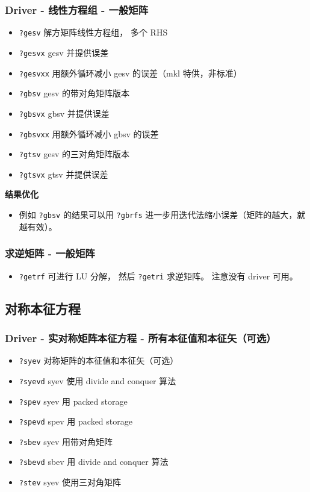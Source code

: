 \subsubsection{Driver - 线性方程组 - 一般矩阵}
\begin{itemize}
\item \verb`?gesv` 解方矩阵线性方程组， 多个 RHS
\item \verb`?gesvx` gesv 并提供误差
\item \verb`?gesvxx` 用额外循环减小 gesv 的误差（mkl 特供，非标准）
\item \verb`?gbsv` gesv 的带对角矩阵版本
\item \verb`?gbsvx` gbsv 并提供误差
\item \verb`?gbsvxx` 用额外循环减小 gbsv 的误差
\item \verb`?gtsv` gesv 的三对角矩阵版本
\item \verb`?gtsvx` gtsv 并提供误差
\end{itemize}

\textbf{结果优化}
\begin{itemize}
\item 例如 \verb`?gbsv` 的结果可以用 \verb`?gbrfs` 进一步用迭代法缩小误差（矩阵的越大，就越有效）。
\end{itemize}

\subsubsection{求逆矩阵 - 一般矩阵}
\begin{itemize}
\item \verb`?getrf` 可进行 LU 分解， 然后 \verb`?getri` 求逆矩阵。 注意没有 driver 可用。
\end{itemize}


\subsection{对称本征方程}
\subsubsection{Driver - 实对称矩阵本征方程 - 所有本征值和本征矢（可选）}
\begin{itemize}
\item \verb`?syev` 对称矩阵的本征值和本征矢（可选）
\item \verb`?syevd` syev 使用 divide and conquer 算法
\item \verb`?spev` syev 用 packed storage
\item \verb`?spevd` spev 用 packed storage
\item \verb`?sbev` syev 用带对角矩阵
\item \verb`?sbevd` sbev 用 divide and conquer 算法
\item \verb`?stev` syev 使用三对角矩阵
\end{itemize}

